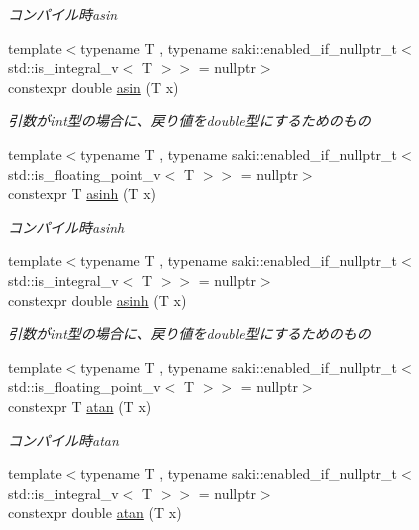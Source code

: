 \begin{DoxyCompactItemize}
\begin{DoxyCompactList}\small\item\em コンパイル時asin \end{DoxyCompactList}\item 
{\footnotesize template$<$typename T , typename saki\+::enabled\+\_\+if\+\_\+nullptr\+\_\+t$<$ std\+::is\+\_\+integral\+\_\+v$<$ T $>$$>$  = nullptr$>$ }\\constexpr double \mbox{\hyperlink{namespacesaki_aac285debedd1f53761a838c0e4f57af0}{asin}} (T x)
\begin{DoxyCompactList}\small\item\em 引数がint型の場合に、戻り値をdouble型にするためのもの \end{DoxyCompactList}\item 
{\footnotesize template$<$typename T , typename saki\+::enabled\+\_\+if\+\_\+nullptr\+\_\+t$<$ std\+::is\+\_\+floating\+\_\+point\+\_\+v$<$ T $>$$>$  = nullptr$>$ }\\constexpr T \mbox{\hyperlink{namespacesaki_ab097a2d600f313b6bdd3099e61a10b9e}{asinh}} (T x)
\begin{DoxyCompactList}\small\item\em コンパイル時asinh \end{DoxyCompactList}\item 
{\footnotesize template$<$typename T , typename saki\+::enabled\+\_\+if\+\_\+nullptr\+\_\+t$<$ std\+::is\+\_\+integral\+\_\+v$<$ T $>$$>$  = nullptr$>$ }\\constexpr double \mbox{\hyperlink{namespacesaki_aac840ca5d9b98ac0a8c5b15752f02072}{asinh}} (T x)
\begin{DoxyCompactList}\small\item\em 引数がint型の場合に、戻り値をdouble型にするためのもの \end{DoxyCompactList}\item 
{\footnotesize template$<$typename T , typename saki\+::enabled\+\_\+if\+\_\+nullptr\+\_\+t$<$ std\+::is\+\_\+floating\+\_\+point\+\_\+v$<$ T $>$$>$  = nullptr$>$ }\\constexpr T \mbox{\hyperlink{namespacesaki_a524b9439c745f69bd8a8b681b03b4b01}{atan}} (T x)
\begin{DoxyCompactList}\small\item\em コンパイル時atan \end{DoxyCompactList}\item 
{\footnotesize template$<$typename T , typename saki\+::enabled\+\_\+if\+\_\+nullptr\+\_\+t$<$ std\+::is\+\_\+integral\+\_\+v$<$ T $>$$>$  = nullptr$>$ }\\constexpr double \mbox{\hyperlink{namespacesaki_acd8a08085fc9210a4e8d61f6c04febe2}{atan}} (T x)

\end{DoxyCompactItemize}
